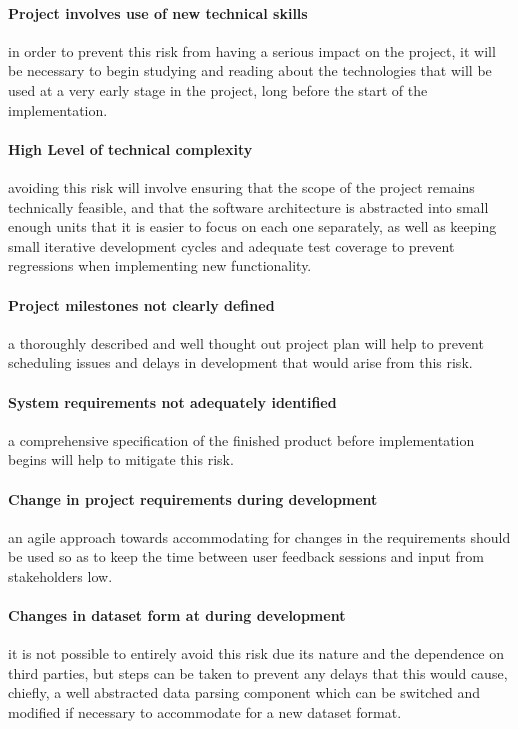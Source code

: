 \documentclass[12pt,a4paper]{article}
\begin{document}
\paragraph{Project involves use of new technical skills} in order to prevent this risk
from having a serious impact on the project, it will be necessary to begin
studying and reading about the technologies that will be used at a very early
stage in the project, long before the start of the implementation.

\paragraph{High Level of technical complexity} avoiding this risk will involve ensuring
that the scope of the project remains technically feasible, and that the
software architecture is abstracted into small enough units that it is easier to
focus on each one separately, as well as keeping small iterative development
cycles and adequate test coverage to prevent regressions when implementing new
functionality.

\paragraph{Project milestones not clearly defined} a thoroughly described and well
thought out project plan will help to prevent scheduling issues and delays in
development that would arise from this risk.


\paragraph{System requirements not adequately identified} a comprehensive specification
of the finished product before implementation begins will help to mitigate this
risk.


\paragraph{Change in project requirements during development} an agile approach towards
accommodating for changes in the requirements should be used so as to keep the
time between user feedback sessions and input from stakeholders low.


\paragraph{Changes in dataset form at during development} it is not possible to entirely
avoid this risk due its nature and the dependence on third parties, but steps
can be taken to prevent any delays that this would cause, chiefly, a well
abstracted data parsing component which can be switched and modified if
necessary to accommodate for a new dataset format.
\end{document}

